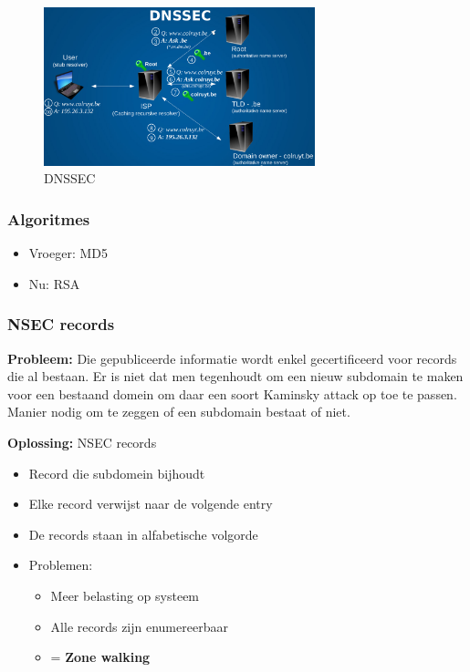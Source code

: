 \documentclass{article}
\newcommand{\bold}[1]{\textbf{#1}}
\begin{document}
\begin{figure}[H]
    \centering
    \includegraphics[width=0.7\textwidth]{dnssec.png}
    \caption{DNSSEC}
\end{figure}

\subsubsection{Algoritmes}

\begin{itemize}
    \item Vroeger: MD5
    \item Nu: RSA
\end{itemize}

\subsubsection{NSEC records}

\bold{Probleem:} Die gepubliceerde informatie wordt enkel gecertificeerd voor records die al bestaan. 
Er is niet dat men tegenhoudt om een nieuw subdomain te maken voor een bestaand domein om daar een soort Kaminsky attack op toe te passen.
Manier nodig om te zeggen of een subdomain bestaat of niet.

\bold{Oplossing:} NSEC records

\begin{itemize}
    \item Record die subdomein bijhoudt
    \item Elke record verwijst naar de volgende entry
    \item De records staan in alfabetische volgorde
    \item Problemen:
    \begin{itemize}
        \item Meer belasting op systeem
        \item Alle records zijn enumereerbaar
        \item = \bold{Zone walking}
    \end{itemize}
\end{itemize}
\end{document}
